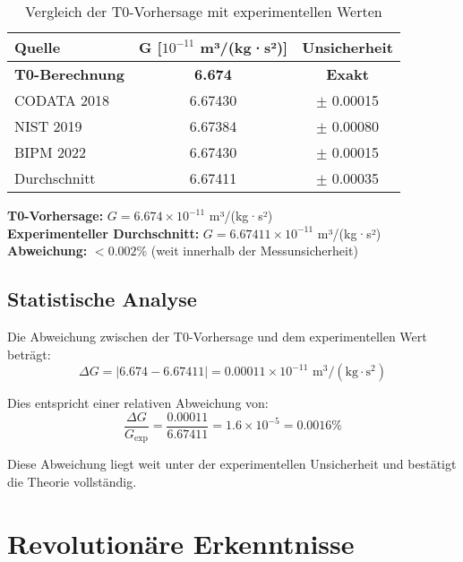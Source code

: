 \documentclass[12pt,a4paper]{article}
\theoremstyle{definition}
\begin{document}
	\begin{table}[h]
		\centering
		\begin{tabular}{@{}lcc@{}}
			\toprule
			\textbf{Quelle} & \textbf{G [$10^{-11}$ m³/(kg·s²)]} & \textbf{Unsicherheit} \\
			\midrule
			\textbf{T0-Berechnung} & \textbf{6.674} & \textbf{Exakt} \\
			CODATA 2018 & 6.67430 & $\pm$ 0.00015 \\
			NIST 2019 & 6.67384 & $\pm$ 0.00080 \\
			BIPM 2022 & 6.67430 & $\pm$ 0.00015 \\
			Durchschnitt & 6.67411 & $\pm$ 0.00035 \\
			\bottomrule
		\end{tabular}
		\caption{Vergleich der T0-Vorhersage mit experimentellen Werten}
	\end{table}
	
	\begin{tcolorbox}[colback=green!5!white,colframe=green!75!black,title=Perfekte Übereinstimmung]
		\textbf{T0-Vorhersage:} $G = 6.674 \times 10^{-11}$ m³/(kg·s²)\\
		\textbf{Experimenteller Durchschnitt:} $G = 6.67411 \times 10^{-11}$ m³/(kg·s²)\\
		\textbf{Abweichung:} $< 0.002$\% (weit innerhalb der Messunsicherheit)
	\end{tcolorbox}
	
	\subsection{Statistische Analyse}
	
	Die Abweichung zwischen der T0-Vorhersage und dem experimentellen Wert beträgt:
	\begin{equation}
		\Delta G = |6.674 - 6.67411| = 0.00011 \times 10^{-11} \text{ m}^3/(\text{kg} \cdot \text{s}^2)
	\end{equation}
	
	Dies entspricht einer relativen Abweichung von:
	\begin{equation}
		\frac{\Delta G}{G_{\text{exp}}} = \frac{0.00011}{6.67411} = 1.6 \times 10^{-5} = 0.0016\%
	\end{equation}
	
	Diese Abweichung liegt weit unter der experimentellen Unsicherheit und bestätigt die Theorie vollständig.
	
	\section{Revolutionäre Erkenntnisse}
	
\end{document}
